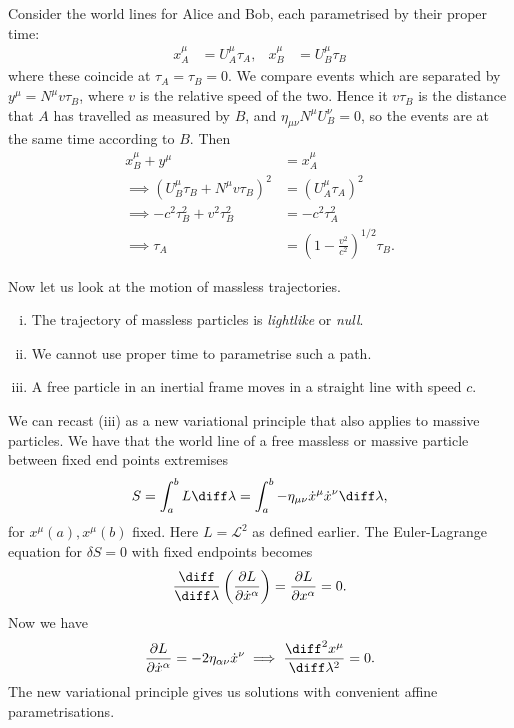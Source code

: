 \documentclass[12pt]{article}
\begin{document}

\begin{exbox}
	Consider the world lines for Alice and Bob, each parametrised by their proper time:
	\begin{align*}
		x_A^\mu &= U_A^\mu \tau_A, & x_B^\mu &= U_B^\mu \tau_B
	\end{align*}
	where these coincide at $\tau_A = \tau_B = 0$. We compare events which are separated by $y^\mu = N^\mu v \tau_B$, where $v$ is the relative speed of the two. Hence it $v \tau_B$ is the distance that $A$ has travelled as measured by $B$, and $\eta_{\mu \nu} N^\mu U_B^{\nu} = 0$, so the events are at the same time according to $B$. Then
	\begin{align*}
		x_B^\mu + y^\mu &= x_A^\mu \\
		\implies (U_B^\mu \tau_B + N^\mu v \tau_B)^2 &= (U_A^\mu \tau_A)^2 \\
		\implies -c^2 \tau_B^2 + v^2 \tau_B^2 &= -c^2 \tau_A^2 \\
		\implies \tau_A &= \left(1 - \frac{v^2}{c^2} \right)^{1/2} \tau_B.
	\end{align*}
\end{exbox}

Now let us look at the motion of massless trajectories.
\begin{enumerate}[(i)]
	\item The trajectory of massless particles is \emph{lightlike} or \emph{null}.
	\item We cannot use proper time to parametrise such a path.
	\item A free particle in an inertial frame moves in a straight line with speed $c$.
\end{enumerate}
We can recast (iii) as a new variational principle that also applies to massive particles. We have that the world line of a free massless or massive particle between fixed end points extremises
\[
S = \int_a^b L \diff \lambda = \int_a^b - \eta_{\mu \nu} \dot x^\mu \dot x^\nu \diff \lambda,
\]
for $x^\mu(a), x^\mu(b)$ fixed. Here $L = \mathcal{L}^2$ as defined earlier. The Euler-Lagrange equation for $\delta S = 0$ with fixed endpoints becomes
\[
\frac{\diff}{\diff \lambda} \left( \frac{\partial L}{\partial \dot x^\alpha} \right) = \frac{\partial L}{\partial x^\alpha} = 0.
\]
Now we have
\[
	\frac{\partial L}{\partial \dot x^\alpha} = - 2 \eta_{\alpha \nu} \dot x^\nu \implies \frac{\diff^2 x^\mu}{\diff \lambda^2} = 0.
\]
The new variational principle gives us solutions with convenient affine parametrisations.
\end{document}
